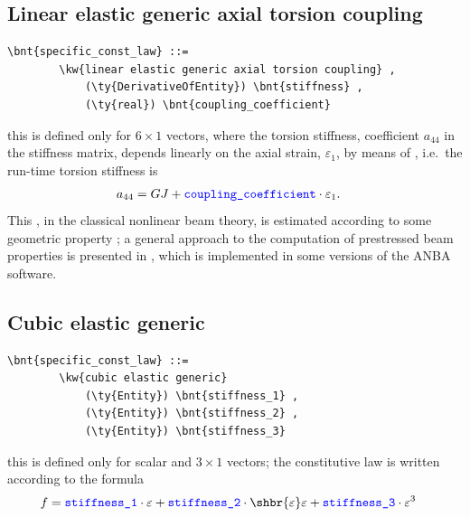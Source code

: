 \subsection{Linear elastic generic axial torsion coupling}
\label{sec:ConstitutiveLaw:LINEAR-ELASTIC-GENERIC-AXIAL-TORSION-COUPLING}
\begin{Verbatim}[commandchars=\\\{\}]
    \bnt{specific_const_law} ::= 
        \kw{linear elastic generic axial torsion coupling} ,
            (\ty{DerivativeOfEntity}) \bnt{stiffness} ,
            (\ty{real}) \bnt{coupling_coefficient}
\end{Verbatim}
this is defined only for $6 \times 1$ vectors, where the torsion stiffness,
coefficient $ a_{44} $ in the stiffness matrix, depends linearly on 
the axial strain, $ \varepsilon_1 $, by means of 
, i.e.\ the run-time torsion stiffness is 
\begin{align}
	a_{44}
	&=
	GJ + \textcolor{blue}{\texttt{coupling\_coefficient}} \cdot \varepsilon_1 .
\end{align}
This , in the classical nonlinear beam theory,
is estimated according to some geometric property \cite{HOUBOLT-BROOKS-1957};
a general approach to the computation of prestressed beam properties
is presented in \cite{BORRI-MERLINI}, which is implemented in some versions
of the ANBA software.

\subsection{Cubic elastic generic}
\begin{Verbatim}[commandchars=\\\{\}]
    \bnt{specific_const_law} ::= 
        \kw{cubic elastic generic}
            (\ty{Entity}) \bnt{stiffness_1} ,
            (\ty{Entity}) \bnt{stiffness_2} ,
            (\ty{Entity}) \bnt{stiffness_3}
\end{Verbatim}
this is defined only for scalar and $3 \times 1$ vectors; the constitutive
law is written according to the formula
\begin{align}
	f
	&=
	\nt{stiffness\_1} \cdot \varepsilon
	+ \nt{stiffness\_2} \cdot \shbr{\varepsilon}\varepsilon
	+ \nt{stiffness\_3} \cdot \varepsilon^3
\end{align}
%

